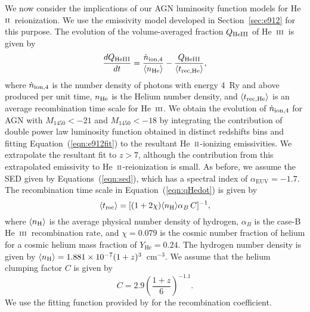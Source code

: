 \documentclass[fleqn,usenatbib]{mnras}
\def\nH{{\rm H}}
\def\nHe{{\rm He}}
\def\nHeIII{{\rm HeIII}}
\def\HeII{\hbox{He~$\scriptstyle\rm II$}}
\def\HeIII{\hbox{He~$\scriptstyle\rm III$}}
\def\HeIII{\hbox{He~$\scriptstyle\rm III$}}
\begin{document}
      We now consider the implications of our AGN luminosity function models
      for \HeII\ reionization.  We use the emissivity model developed in
      Section~\ref{sec:e912} for this purpose.  The evolution of the
      volume-averaged fraction $Q_\nHeIII$ of \HeIII\ is given by
      \citep{2012ApJ...746..125H}
      \begin{equation}
        {dQ_\nHeIII\over dt}={\dot n_{\rm ion,4}\over \langle n_\nHe \rangle} -{Q_\nHeIII\over
          \langle t_{\rm rec,He}\rangle},
        \label{eqn:qHedot}
      \end{equation}
      where $\dot n_{\rm ion,4}$ is the number density of photons with
      energy 4~Ry and above produced per unit time, $n_\nHe$ is the Helium
      number density, and $\langle t_{\rm rec,He}\rangle$ is an average
      recombination time scale for \HeIII.  We obtain the evolution of $\dot
      n_{\rm ion,4}$ for AGN with $M_\mathrm{1450}<-21$ and
      $M_\mathrm{1450}<-18$ by integrating the contribution of double power
      law luminosity function obtained in distinct redshifts bins and
      fitting Equation~(\ref{eqn:e912fit}) to the resultant \HeII-ionizing
      emissivities.  We extrapolate the resultant fit to $z>7$, although the
      contribution from this extrapolated emissivity to \HeII-reionization
      is small.  As before, we assume the SED given by
      Equations~(\ref{eqn:sed}), which has a spectral index of
      $\alpha_\mathrm{EUV}=-1.7$.  The recombination time scale in
      Equation~(\ref{eqn:qHedot}) is given by
      \begin{equation}
        \langle t_{\rm rec}\rangle=[(1+2\chi) \langle n_\nH\rangle \alpha_B\,C]^{-1},
        \label{eq:trec}
      \end{equation}
      where $\langle n_\nH\rangle$ is the average physical number density of
      hydrogen, $\alpha_B$ is the case-B \HeIII\ recombination rate, and
      $\chi=0.079$ is the cosmic number fraction of helium for a cosmic
      helium mass fraction of $Y_\mathrm{He}=0.24$.  The hydrogen number
      density is given by $\langle n_\nH\rangle=1.881\times
      10^{-7}(1+z)^3$~cm$^{-3}$.  We assume that the helium clumping factor
      $C$ is given by \citep{2015ApJ...813L...8M}
      \begin{equation}
        C = 2.9\left(\frac{1+z}{6}\right)^{-1.1}.
      \end{equation}
      We use the fitting function provided by \citet{1997MNRAS.292...27H}
      for the recombination coefficient.
\end{document}
